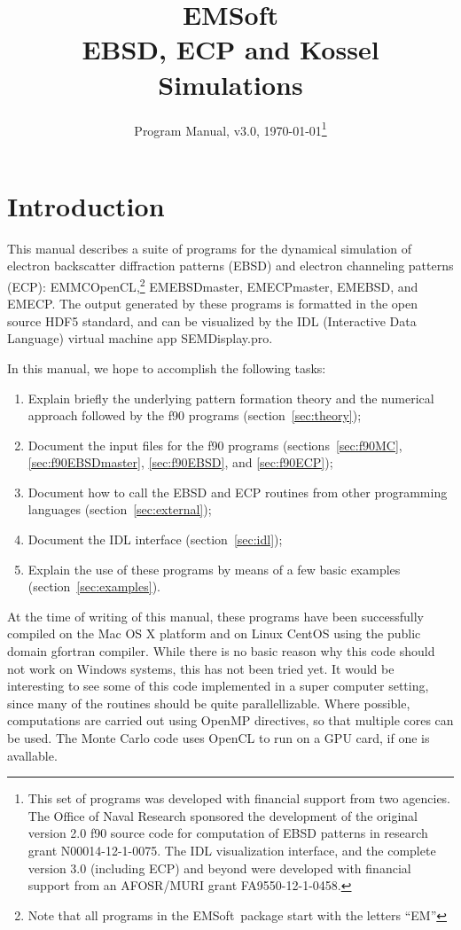 \documentclass[DIV=calc, paper=letter, fontsize=11pt]{scrartcl}	 %
\title{EMSoft\\ EBSD, ECP and Kossel Simulations} %
\author{\vspace*{-0.7in}} %
\date{Program Manual, v3.0, \today\protect\footnote{This set of programs was developed with financial support from two agencies. 
The Office of Naval Research sponsored the development of the original version 2.0 f90 source code for computation of EBSD patterns in research 
grant N00014-12-1-0075.  The IDL visualization interface, and the complete version 3.0 (including ECP) and beyond were developed with financial 
support from an AFOSR/MURI grant FA9550-12-1-0458.}}
\newcommand{\ctp}{\textsf{EMSoft}}
\begin{document}
\maketitle

\vspace*{-0.5in}\begin{figure}[h]
\leavevmode\centering
\epsfxsize=4.0in
\end{figure}

\renewcommand{\contentsname}{Table of Contents}
{\vspace*{-0.1in}\footnotesize\tableofcontents}

\newpage
\section{Introduction}
This manual describes a suite of programs for the dynamical simulation of electron backscatter diffraction patterns (EBSD) and electron channeling patterns (ECP):
\textsf{EMMCOpenCL},\footnote{Note that all programs in the \ctp\ package start with the letters ``EM''} \textsf{EMEBSDmaster}, \textsf{EMECPmaster}, \textsf{EMEBSD},
and \textsf{EMECP}.  The output generated by these programs is formatted in the open source HDF5 standard, and
can be visualized by the IDL (Interactive Data Language) virtual machine app \textsf{SEMDisplay.pro}.  

In this manual, we hope to accomplish the following tasks:
\begin{enumerate}
	\item Explain briefly the underlying pattern formation theory and the numerical approach followed by the f90 programs (section~\ref{sec:theory});
	\item Document the input files for the f90 programs (sections~\ref{sec:f90MC}, \ref{sec:f90EBSDmaster}, \ref{sec:f90EBSD}, and \ref{sec:f90ECP});
	\item Document how to call the EBSD and ECP routines from other programming languages (section~\ref{sec:external});
	\item Document the IDL interface (section~\ref{sec:idl});
	\item Explain the use of these programs by means of a few basic examples (section~\ref{sec:examples}).
\end{enumerate}

At the time of writing of this manual, these programs have been successfully compiled on the Mac OS X platform and on Linux CentOS using the public domain gfortran compiler.  
While there is no basic reason why this code should not work on Windows systems, this has not been tried yet.
It would be interesting to see some of this code implemented in a super computer setting, since many of the routines should be quite parallellizable.  Where possible, computations
are carried out using OpenMP directives, so that multiple cores can be used.  The Monte Carlo code uses OpenCL to run on a GPU card, if one is avallable.
\end{document}
